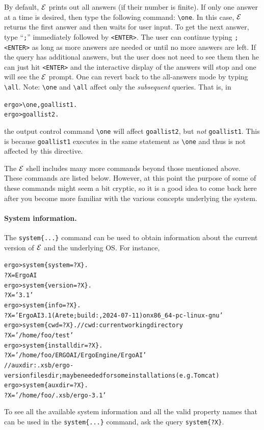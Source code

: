 \documentclass[11pt]{article}
\newcommand{\ERGO}{\mbox{\ensuremath{\cal{E}}\smaller{{\sc{RGO}}}}\xspace}
\newcommand{\FLSYSTEM}{\ERGO}
\newcommand{\prompt}{ergo> }
\newcommand{\bs}{\textbackslash}
\begin{document}
By default, \FLSYSTEM prints out all answers (if their number is
finite). If only one answer at a time is
desired, then type the following command: {\tt \bs{}one}.
In this case, \FLSYSTEM returns the first answer and then waits for user
input. To get the
next answer, type ``\texttt{;}'' immediately followed by \texttt{<ENTER>}. 
The user can continue typing \texttt{;<ENTER>} as long as more answers are
needed or until no more answers are left. If the query has additional
answers, but the user does not need to see them then he can just hit
\texttt{<ENTER>} and the interactive display of the answers will stop and
one will see the \FLSYSTEM prompt.  
One can revert back to
the all-answers mode by typing {\tt \bs{}all}. Note: {\tt \bs{}one} and {\tt \bs{}all}
affect only the \emph{subsequent} queries. That is, in
\begin{alltt}
     \prompt \bs{}one, goallist1.
     \prompt goallist2.
\end{alltt}
the output control command {\tt \bs{}one} will affect {\tt goallist2},
but \emph{not} {\tt goallist1}. This is because {\tt goallist1} executes in
the same statement as {\tt \bs{}one} and thus is not affected by this directive.

The \FLSYSTEM shell includes many more commands beyond those mentioned above.
These commands are listed below. However, at this point the purpose of some
of these commands might seem a bit cryptic, so it is a good idea to come
back here after you become more familiar with the various concepts
underlying the system.

\paragraph{System information.}
The \texttt{system\{...\}}  command can be used to obtain information about
the current version of \FLSYSTEM and the underlying OS. For instance,
\begin{alltt}
 \prompt system\{system=?X\}.
 ?X = ErgoAI
 \prompt system\{version=?X\}.
 ?X = '3.1'
 \prompt system\{info=?X\}.
 ?X = 'ErgoAI 3.1 (Arete; build: , 2024-07-11) on x86_64-pc-linux-gnu'
 \prompt system\{cwd=?X\}.     // cwd: current working directory
 ?X = '/home/foo/test'
 \prompt system\{installdir=?X\}.
 ?X = '/home/foo/ERGOAI/ErgoEngine/ErgoAI'
 // auxdir: .xsb/ergo-version files dir; may be needed for some installations (e.g. Tomcat)
 \prompt system\{auxdir=?X\}.
 ?X = '/home/foo/.xsb/ergo-3.1'
\end{alltt}
To see all the available system information and all the valid property
names that can be used in the \texttt{system\{...\}} command, ask the query
\texttt{system\{?X\}}.
\end{document}
